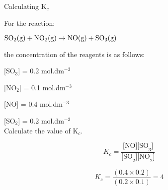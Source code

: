 \begin{wex}{Calculating K$_{c}$}{For the reaction:

\begin{center}
$\rm{SO_{2}(g) + NO_{2}(g) \rightarrow NO(g) + SO_{3}(g)}$
\end{center}

the concentration of the reagents is as follows:

[SO$_{3}$] = 0.2 mol.dm$^{-3}$

[NO$_{2}$] = 0.1 mol.dm$^{-3}$

[NO] = 0.4 mol.dm$^{-3}$

[SO$_{2}$] = 0.2 mol.dm$^{-3}$\\

Calculate the value of K$_{c}$.\\
}

{

\begin{equation*}
K_{c} = \frac{\text{[NO][SO}_{3}\text{]}}{\text{[SO}_{2}\text{][NO}_{2}\text{]}}
\end{equation*}


\begin{equation*}
K_{c} = \frac{(0.4 \times 0.2)}{(0.2 \times 0.1)} = 4
\end{equation*}
}
\end{wex}

